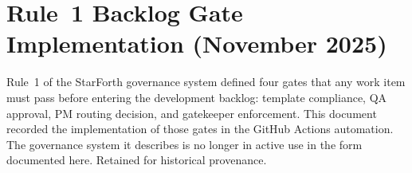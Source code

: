 
\section*{Rule~1 Backlog Gate Implementation (November 2025)}

Rule~1 of the StarForth governance system defined four gates that any work
item must pass before entering the development backlog: template compliance,
QA approval, PM routing decision, and gatekeeper enforcement. This document
recorded the implementation of those gates in the GitHub Actions automation.
The governance system it describes is no longer in active use in the form
documented here. Retained for historical provenance.

